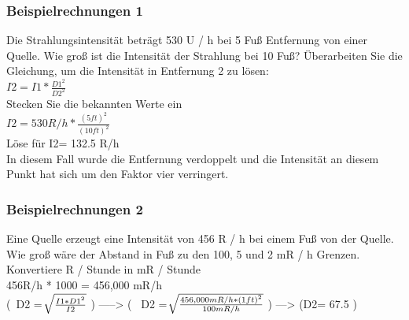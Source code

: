 \subsubsection{Beispielrechnungen 1}
Die Strahlungsintensität beträgt 530 U / h bei 5 Fuß Entfernung von einer Quelle. 
Wie groß ist die Intensität der Strahlung bei 10 Fuß?
Überarbeiten Sie die Gleichung, um die Intensität in Entfernung 2 zu lösen:\\
\( I2 = I1*\frac{D1^2} { D2^2} \) \\
Stecken Sie die bekannten Werte ein\\
\( I2 = 530R/h * \frac{(5ft)^2} {(10ft)^2} \) \\

Löse für I2= 132.5 R/h \\
In diesem Fall wurde die Entfernung verdoppelt und die Intensität an diesem Punkt hat sich um den Faktor vier verringert.

\subsubsection{Beispielrechnungen 2}
Eine Quelle erzeugt eine Intensität von 456 R / h bei einem Fuß von der Quelle. Wie groß wäre der Abstand in Fuß zu den 100, 5 und 2 mR / h Grenzen.\\
Konvertiere R / Stunde in mR / Stunde\\
456R/h * 1000 = 456,000 mR/h\\
\big (\ D2 = $\sqrt[\leftroot{3}\uproot{3}]{\tfrac{I1*D1^2}{I2}}$  \big) -----> \Big(
\ D2 = $\sqrt[\leftroot{3}\uproot{3}]{\tfrac{456,000 mR/h * (1ft)^2}{100 mR/h}}$ \Big) ---> \Bigg(D2= 67.5 \Bigg) 
